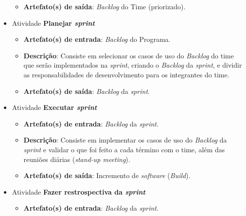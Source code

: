 \begin{itemize}
\begin{itemize}
	    \item \textbf{Artefato(s) de saída}: \textit{Backlog} do Time (priorizado).
		  
	  \end{itemize}
	  
     \item Atividade \textbf{Planejar \textit{sprint}}
      
	  \begin{itemize}
	    \item \textbf{Artefato(s) de entrada}: \textit{Backlog} do Programa.
	    
	    \item \textbf{Descrição}: Consiste em selecionar os casos de uso do \textit{Backlog} do time que serão
	      implementados na \textit{sprint}, criando o \textit{Backlog} da \textit{sprint}, e dividir as
	      responsabilidades de desenvolvimento para os integrantes do time.
	    
	    \item \textbf{Artefato(s) de saída}: \textit{Backlog} da \textit{sprint}.
		  
	  \end{itemize}
	  
     \item Atividade \textbf{Executar \textit{sprint}}
      
	  \begin{itemize}
	    \item \textbf{Artefato(s) de entrada}: \textit{Backlog} da \textit{sprint}.
	    
	    \item \textbf{Descrição}: Consiste em implementar os casos de uso do \textit{Backlog} da \textit{sprint}
	      e validar o que foi feito a cada término com o time, além das reuniões diárias (\textit{stand-up meeting}).
	    
	    \item \textbf{Artefato(s) de saída}: Incremento de \textit{software} (\textit{Build}).
		  
	  \end{itemize}
	  
     \item Atividade \textbf{Fazer restrospectiva da \textit{sprint}}
      
	  \begin{itemize}
	    \item \textbf{Artefato(s) de entrada}: \textit{Backlog} da \textit{sprint}.
	    

\end{itemize}
\end{itemize}

